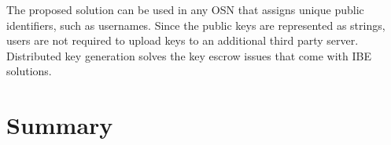 The proposed solution can be used in any OSN that assigns unique public identifiers, such as usernames. Since the public keys are represented as strings, users are not required to upload keys to an additional third party server. Distributed key generation solves the key escrow issues that come with IBE solutions.

\section{Summary}


\newpage

\thispagestyle{empty}

\makeatletter
\setlength{\headsep}{-10pt}
\makeatother

